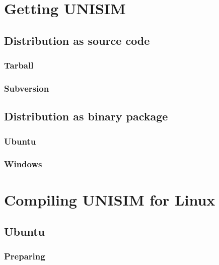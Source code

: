 \section{Getting UNISIM}
\label{getting_unisim}

\subsection{Distribution as source code}
\label{distribution_as_source_code}

\subsubsection{Tarball}
\label{distribution_as_source_code_tarball}

\subsubsection{Subversion}
\label{distribution_as_source_code_subversion}

\subsection{Distribution as binary package}
\label{distribution_as_binary_package}

\subsubsection{Ubuntu}
\label{distribution_as_binary_package_ubuntu}

\subsubsection{Windows}
\label{distribution_as_binary_package_windows}

\section{Compiling UNISIM for Linux}
\label{compiling_unisim_for_linux}

\subsection{Ubuntu}
\label{compiling_unisim_for_ubuntu}

\subsubsection{Preparing}

